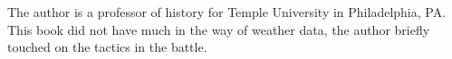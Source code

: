 The author is a professor of history for Temple University in Philadelphia, PA.
This book did not have much in the way of weather data, the author briefly
touched on the tactics in the battle.
